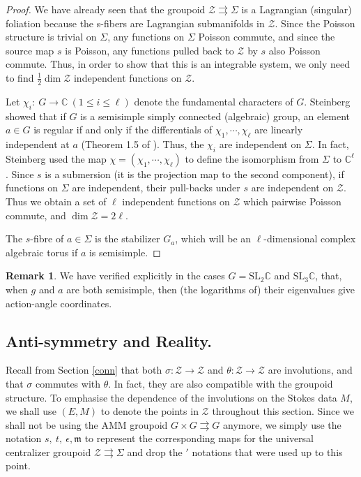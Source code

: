\documentclass[a4paper,12pt,leqno]{amsart}
\numberwithin{equation}{section}
\theoremstyle{plain}
\theoremstyle{definition}
\newtheorem{remark}[theorem]{Remark}
\newcommand{\SL}{\textrm{SL}}
\newcommand{\cZ}{\mathcal{Z}}
\newcommand{\bC}{\mathbb{C}}
\newcommand{\fm}{\mathfrak{m}}
\begin{document}
\begin{proof}
We have already seen that the groupoid $\cZ\rightrightarrows\Sigma$ is a Lagrangian (singular) foliation because the s-fibers are Lagrangian submanifolds in $\cZ$. 
Since the Poisson structure is trivial on $\Sigma$, any functions on $\Sigma$ Poisson commute, and since the source map $s$ is Poisson, any functions pulled back to $\cZ$ by $s$ also Poisson commute.
Thus, in order to show that this is an integrable system, we only need to find $\frac{1}{2}\dim \cZ$ independent functions on $\cZ$.

Let $\chi_i:~G\to \bC~ (1\leq i \leq \ell)$ denote the fundamental characters of $G$. 
Steinberg showed that if $G$ is a semisimple simply connected (algebraic) group, an element $a\in G$ is regular if and only if the differentials of $\chi_1,\cdots,\chi_\ell$ are linearly independent at $a$ (Theorem 1.5 of \cite{St65}).
Thus, the $\chi_i$ are independent on $\Sigma$. In fact, Steinberg used the map $\chi=(\chi_1,\cdots,\chi_\ell)$ to define the isomorphism from $\Sigma$ to $\bC^\ell$. 
Since $s$ is a submersion (it is the projection map to the second component), if functions on $\Sigma$ are independent, their pull-backs under $s$ are independent on $\cZ$. 
Thus we obtain a set of $\ell$ independent functions on $\cZ$ which pairwise Poisson commute, and $\dim\cZ=2\ell$.

The $s$-fibre of $a\in \Sigma$ is the stabilizer $G_a$, which will be an $\ell$-dimensional complex algebraic torus if $a$ is semisimple. 
\end{proof}

\begin{remark}
We have verified explicitly in the cases $G=\SL_2\bC$ and $\SL_3\bC$, that, when $g$ and $a$ are both semisimple, then (the logarithms of) their eigenvalues give action-angle coordinates.
\end{remark}



\subsection{Anti-symmetry and Reality.}\label{antisymm}

Recall from Section \ref{conn} that both $\sigma:\cZ\to\cZ$ and $\theta:\cZ\to\cZ$ are involutions, and that $\sigma$ commutes with $\theta$. In fact, they are also compatible with the groupoid structure. To emphasise the dependence of the involutions on the Stokes data $M$, we shall use $(E,M)$ to denote the points in $\cZ$ throughout this section.
Since we shall not be using the AMM groupoid $G\times G\rightrightarrows G$ anymore, we simply use the notation $s,\ t,\ \epsilon, \fm$ to represent the corresponding maps for the universal centralizer groupoid $\cZ\rightrightarrows \Sigma$ and drop the $'$ notations that were used up to this point.
\end{document}
